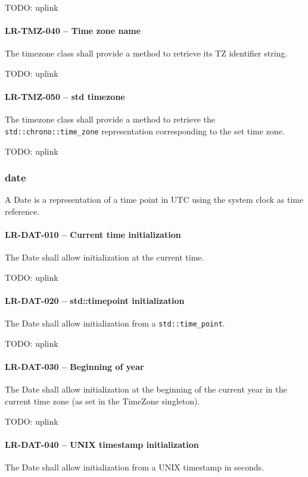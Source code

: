 TODO: uplink
\paragraph{LR-TMZ-040 -- Time zone name}
The timezone class shall provide a method to retrieve its TZ identifier string.

TODO: uplink

\paragraph{LR-TMZ-050 -- std time\textunderscore zone}
The timezone class shall provide a method to retrieve the
\lstinline{std::chrono::time_zone} representation corresponding to the set
time zone.

TODO: uplink

\subsubsection{date}
A Date is a representation of a time point in UTC using the system clock
as time reference.

\paragraph{LR-DAT-010 -- Current time initialization}
The Date shall allow initialization at the current time.

TODO: uplink

\paragraph{LR-DAT-020 -- std::time\textunderscore point initialization}
The Date shall allow initialization from a \lstinline{std::time_point}.

TODO: uplink

\paragraph{LR-DAT-030 -- Beginning of year}
The Date shall allow initialization at the beginning of the current year
in the current time zone (as set in the TimeZone singleton).

TODO: uplink

\paragraph{LR-DAT-040 -- UNIX timestamp initialization}
The Date shall allow initialization from a UNIX timestamp in seconds.

